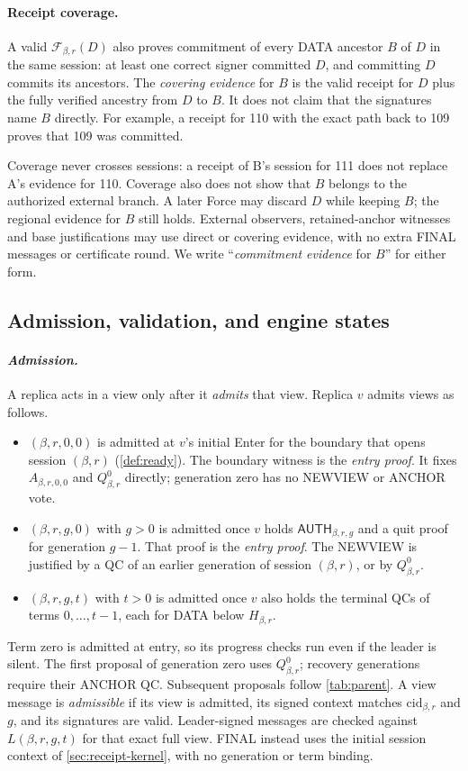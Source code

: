 \documentclass[11pt,a4paper]{article}
\newcommand{\FC}{\mathcal F}
\newcommand{\tagg}[1]{\ensuremath{\mathsf{#1}}}
\newcommand{\defterm}[1]{\textcolor{rrBlue}{\textit{#1}}}
\begin{document}
\paragraph{Receipt coverage.}
\label{sec:coverage}
A valid $\FC_{\beta,r}(D)$ also proves commitment of every DATA ancestor
$B$ of $D$ in the same session: at least one correct signer committed
$D$, and committing $D$ commits its ancestors. The \defterm{covering
evidence} for $B$ is the valid receipt for $D$ plus the fully verified
ancestry from $D$ to $B$. It does not claim that the signatures name $B$
directly. For example, a receipt for 110 with the exact path back to 109
proves that 109 was committed.

Coverage never crosses sessions: a receipt of B's session for 111 does
not replace A's evidence for 110. Coverage also does not show that $B$
belongs to the authorized external branch. A later Force may discard $D$
while keeping $B$; the regional evidence for $B$ still holds. External
observers, retained-anchor witnesses and base justifications may use
direct or covering evidence, with no extra FINAL messages or certificate
round. We write ``\defterm{commitment evidence} for $B$'' for either form.

\subsection{Admission, validation, and engine states}
\label{sec:admission}
\paragraph{\defterm{Admission.}}
A replica acts in a view only after it \emph{admits} that view.
Replica $v$ admits views as follows.
\begin{itemize}
\item $(\beta,r,0,0)$ is admitted at $v$'s initial Enter for the boundary
that opens session $(\beta,r)$ (\cref{def:ready}). The boundary witness is
the \defterm{entry proof}. It fixes $A_{\beta,r,0,0}$ and
$Q^0_{\beta,r}$ directly; generation zero has no NEWVIEW or ANCHOR vote.
\item $(\beta,r,g,0)$ with $g>0$ is admitted once $v$ holds
$\tagg{AUTH}_{\beta,r,g}$ and a quit proof for generation $g-1$. That proof is
the \defterm{entry proof}. The NEWVIEW is justified by a QC of an earlier
generation of session $(\beta,r)$, or by $Q_{\beta,r}^0$.
\item $(\beta,r,g,t)$ with $t>0$ is admitted once $v$ also holds the
terminal QCs of terms $0,\ldots,t-1$, each for DATA below $H_{\beta,r}$.
\end{itemize}
Term zero is admitted at entry, so its progress checks run even if
the leader is silent. The first proposal of generation zero uses
$Q^0_{\beta,r}$; recovery generations require their ANCHOR QC.
Subsequent proposals follow \cref{tab:parent}. A view message is
\defterm{admissible} if its view is admitted, its signed context matches
$\mathrm{cid}_{\beta,r}$ and $g$, and its signatures are
valid. Leader-signed messages are checked against $L(\beta,r,g,t)$ for
that exact full view.
FINAL instead uses the initial session context of \cref{sec:receipt-kernel},
with no generation or term binding.
\end{document}
